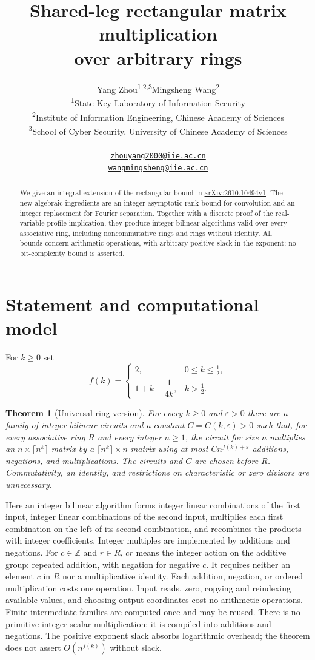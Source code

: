 \documentclass[11pt]{article}
\title{Shared-leg rectangular matrix multiplication\protect\\over arbitrary rings}
\author{Yang Zhou\textsuperscript{1,2,3}\qquad Mingsheng Wang\textsuperscript{2}\\[0.8ex]
  {\small\textsuperscript{1}State Key Laboratory of Information Security}\\
  {\small\textsuperscript{2}Institute of Information Engineering, Chinese Academy of Sciences}\\
  {\small\textsuperscript{3}School of Cyber Security, University of Chinese Academy of Sciences}\\\\[0.8ex]
  {\small\href{mailto:zhouyang2000@iie.ac.cn}{\texttt{zhouyang2000@iie.ac.cn}}}\\
  {\small\href{mailto:wangmingsheng@iie.ac.cn}{\texttt{wangmingsheng@iie.ac.cn}}}}
\date{}
\newtheorem{theorem}{Theorem}[section]
\theoremstyle{remark}
\newcommand{\Z}{\mathbb Z}
\begin{document}
\maketitle
\begin{abstract}
We give an integral extension of the rectangular bound in
\href{https://arxiv.org/abs/2610.10494}{arXiv:2610.10494v1}.
The new algebraic ingredients are an integer asymptotic-rank bound for
convolution and an integer replacement for Fourier separation.
Together with a discrete proof of the real-variable profile implication,
they produce integer bilinear algorithms valid over every associative
ring, including noncommutative rings and rings without identity.
All bounds concern arithmetic operations, with arbitrary positive
slack in the exponent; no bit-complexity bound is asserted.
\end{abstract}

\section{Statement and computational model}

For $k\geq0$ set
\[
 f(k)=\begin{cases}
 2,&0\leq k\leq\tfrac12,\\
 1+k+\dfrac1{4k},&k>\tfrac12.
 \end{cases}
\]
\begin{theorem}[Universal ring version]\label{thm:ring}
For every $k\geq0$ and $\varepsilon>0$ there are a family of integer
bilinear circuits and a constant $C=C(k,\varepsilon)>0$ such that,
for every associative ring $R$ and every integer $n\geq1$, the circuit
for size $n$ multiplies an $n\times\lceil n^k\rceil$ matrix by a
$\lceil n^k\rceil\times n$ matrix using at most
$Cn^{f(k)+\varepsilon}$ additions, negations, and multiplications.
The circuits and $C$ are chosen before $R$. Commutativity, an identity,
and restrictions on characteristic or zero divisors are unnecessary.
\end{theorem}

Here an integer bilinear algorithm forms integer linear combinations
of the first input, integer linear combinations of the second input,
multiplies each first combination on the left of its second
combination, and recombines the products with integer coefficients.
Integer multiples are implemented by additions and negations.
For $c\in\Z$ and $r\in R$, $cr$ means the integer action on the
additive group: repeated addition, with negation for negative $c$.
It requires neither an element $c$ in $R$ nor a multiplicative identity.
Each addition, negation, or ordered multiplication costs one operation.
Input reads, zero, copying and reindexing available values, and choosing
output coordinates cost no arithmetic operations. Finite intermediate
families are computed once and may be reused. There is no primitive
integer scalar multiplication: it is compiled into additions and negations.
The positive exponent slack absorbs logarithmic overhead; the theorem
does not assert $O(n^{f(k)})$ without slack.
\end{document}
